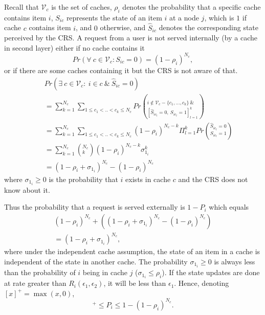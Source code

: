 \documentclass[conference]{IEEEtran}
\theoremstyle{plain}
\theoremstyle{remark}
\begin{document}
Recall that  $\mathcal{V}_c$ is the set of caches, $\rho_i$ denotes the probability that a specific cache contains item $i$, $S_{ic}$ represents the state of an item $i$ at a node $j$, which is $1$ if cache $c$ contains item $i$, and $0$ otherwise, and $\hat{S}_{ic}$ denotes the corresponding state perceived by the CRS. A request from a user is not served internally (by a cache in second layer) either if no cache contains it \begin{equation} Pr(\forall\ c\in \mathcal{V}_c:S_{ic}=0)=(1-\rho_i)^{N_c}, \end{equation}
or if there are some caches containing it but the CRS is not aware of that.
\begin{eqnarray}
  &&Pr(\exists\ c \in \mathcal{V}_c:\ i \in c\ \&\ \hat{S}_{ic}=0) \nonumber \\
  &&=\sum_{k=1}^{N_c} \sum_{1\leq c_1<..<c_k\leq N_c} Pr(^{i \notin \mathcal{V}_c-\{c_1,...,c_k\}\ \&\ }_{[\hat{S}_{ic_l}=0,\ S_{ic_l}=1]^k_{l=1}}) \nonumber \\
  &&=\sum_{k=1}^{N_c} \sum_{1\leq c_1<..<c_k\leq N_c} (1-\rho_i)^{N_c-k} \Pi_{l=1}^k Pr(^{\hat{S}_{ic_l}=0}_{S_{ic_l}=1}) \nonumber \\
  &&=\sum_{k=1}^{N_c} (^{N_c}_k) (1-\rho_i)^{N_c-k} \sigma_{1_i}^k  \nonumber \\
	&&=(1-\rho_i+\sigma_{1_i})^{N_c}-(1-\rho_i)^{N_c} \nonumber
\end{eqnarray}
where $\sigma_{1_i}\geq 0$ is the probability that $i$ exists in cache $c$ and the CRS does not know about it.

Thus the probability that a request is served externally is $1-P_i$ which equals
\begin{eqnarray}
&(1-\rho_i)^{N_c} +((1-\rho_i+\sigma_{1_i})^{N_c}-(1-\rho_i)^{N_c})& \nonumber \\
&= (1-\rho_i+\sigma_{1_i})^{N_c},& \label{eq:Pext}
\end{eqnarray}
where under the independent cache assumption, the state of an item in a cache is independent of the state in another cache. The probability $\sigma_{1_i}\geq 0$ is always less than the probability of $i$ being in cache $j$ ($\sigma_{1_i}\leq \rho_i$). If the state updates are done at rate greater than $R_i(\epsilon_1,\epsilon_2)$, it will be less than $\epsilon_1$. Hence, denoting $[x]^+ = \max(x,0)$, 
\begin{equation}
[1-(1-\rho_i+\epsilon_1)^{N_c}]^+\leq P_i \leq 1-(1-\rho_i)^{N_c}.
\end{equation}
\end{document}
